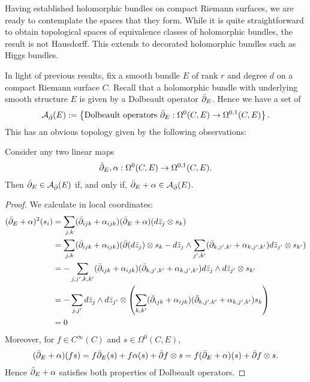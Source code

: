 \documentclass[12pt]{ociamthesis}  %
\begin{document}
Having established holomorphic bundles on compact Riemann surfaces,
we are ready to contemplate the spaces that they form. While it is
quite straightforward to obtain topological spaces of equivalence
classes of holomorphic bundles, the result is not Hausdorff.
This extends to decorated holomorphic bundles such as Higgs bundles.

In light of previous results, fix a smooth bundle $E$ of rank $r$
and degree $d$ on a compact Riemann surface $C$.
Recall that a holomorphic bundle with underlying smooth structure $E$
is given by a Dolbeault operator ${\bar{\partial}}_E$. Hence we have a set of
\begin{align*}
  \mathcal A_{\bar{\partial}} (E) := \left\lbrace{
    \text{Dolbeault operators ${\bar{\partial}}_E : \Omega^0(C,E) \to \Omega^{0,1}(C,E)$}
  }\right\rbrace.
\end{align*}
This has an obvious topology given by the following observations:
\begin{lemma}\label{lem:affine_space_of_dolbeault_operators}
  Consider any two linear maps 
  \begin{align*}
    {\bar{\partial}}_E,\alpha : \Omega^0(C,E) \to \Omega^{0,1}(C,E).
  \end{align*}
  Then ${\bar{\partial}}_E\in \mathcal A_{\bar{\partial}} (E)$ if, and only if, ${\bar{\partial}}_E+\alpha\in \mathcal A_{\bar{\partial}} (E)$.
  \begin{proof}
    We calculate in local coordinates:
    \begin{align*}
      ({\bar{\partial}}_E + \alpha)^2(s_i)
       & = \sum_{j,k} ({\bar{\partial}}_{ijk} + \alpha_{ijk})({\bar{\partial}}_E + \alpha)( d\bar z_j\otimes s_k)                                                                                     \\
       & = \sum_{j,k} ({\bar{\partial}}_{ijk} + \alpha_{ijk})({\bar{\partial}}(d\bar z_j) \otimes s_k -  d\bar z_j \wedge \sum_{j',k'}({\bar{\partial}}_{k,j',k'} + \alpha_{k,j',k'}) d\bar z_{j'}\otimes s_{k'}) \\
       & = - \sum_{j,j',k,k'} ({\bar{\partial}}_{ijk} + \alpha_{ijk})({\bar{\partial}}_{k,j',k'} + \alpha_{k,j',k'}) d\bar z_j \wedge d\bar z_{j'}\otimes s_{k'}                                      \\
       & = - \sum_{j,j'}
      d\bar z_j \wedge d\bar z_{j'}\otimes \left(
      \sum_{k,k'} ({\bar{\partial}}_{ijk} + \alpha_{ijk})({\bar{\partial}}_{k,j',k'} + \alpha_{k,j',k'}) s_{k}\right)                                                                                 \\
       & = 0
    \end{align*}
    Moreover, for $f\in C^\infty(C)$ and $s\in\Omega^0(C,E)$,
    \begin{align*}
      ({\bar{\partial}}_E + \alpha)(fs) = f{\bar{\partial}}_E(s) + f\alpha(s) + {\bar{\partial}} f \otimes s
      = f({\bar{\partial}}_E+\alpha)(s) + {\bar{\partial}} f \otimes s.
    \end{align*}
    Hence ${\bar{\partial}}_E + \alpha$ satisfies both properties of Dolbeault
    operators.
  \end{proof}
\end{lemma}
\end{document}
